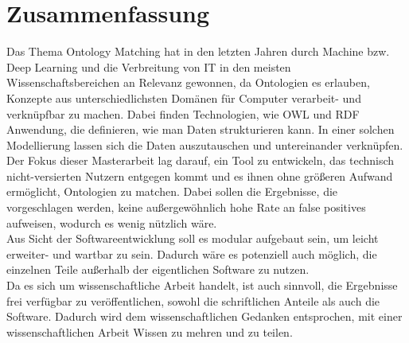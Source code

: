 %
\chapter{Zusammenfassung}
\label{chap:conclusion}      

Das Thema Ontology Matching hat in den letzten Jahren durch Machine bzw. Deep
Learning und die Verbreitung von IT in den meisten Wissenschaftsbereichen an
Relevanz gewonnen, da Ontologien es erlauben, Konzepte aus unterschiedlichsten
Domänen für Computer verarbeit- und verknüpfbar zu machen. Dabei
finden Technologien, wie OWL und RDF Anwendung, die definieren, wie man Daten
strukturieren kann. In einer solchen Modellierung lassen sich die Daten
auszutauschen und untereinander verknüpfen.\\
Der Fokus dieser Masterarbeit lag darauf, ein Tool zu entwickeln, das technisch
nicht-versierten Nutzern entgegen kommt und es ihnen ohne größeren Aufwand
ermöglicht, Ontologien zu matchen. Dabei sollen die Ergebnisse, die
vorgeschlagen werden, keine außergewöhnlich hohe Rate an false positives
aufweisen, wodurch es wenig nützlich wäre.\\
Aus Sicht der Softwareentwicklung soll es modular aufgebaut sein, um leicht
erweiter- und wartbar zu sein. Dadurch wäre es potenziell auch möglich, die
einzelnen Teile außerhalb der eigentlichen Software zu nutzen.\\
Da es sich um wissenschaftliche Arbeit handelt, ist auch sinnvoll, die
Ergebnisse frei verfügbar zu veröffentlichen, sowohl die schriftlichen Anteile
als auch die Software. Dadurch wird dem wissenschaftlichen Gedanken entsprochen,
mit einer wissenschaftlichen Arbeit Wissen zu mehren und zu teilen.

